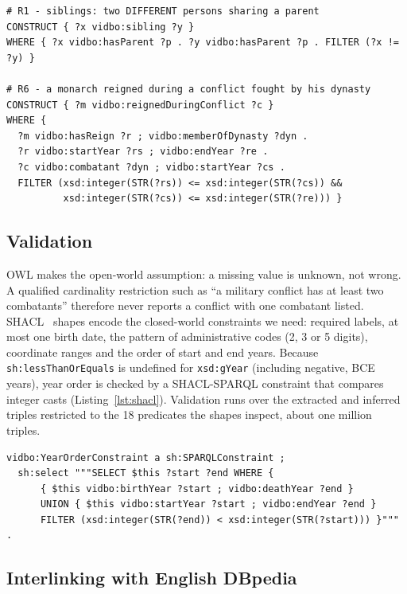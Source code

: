 \documentclass{article}
\begin{document}
\begin{lstlisting}[language=sparql, caption={Two rules of the rule layer: the sibling rule and the temporal rule R6.}, label=lst:rules]
# R1 - siblings: two DIFFERENT persons sharing a parent
CONSTRUCT { ?x vidbo:sibling ?y }
WHERE { ?x vidbo:hasParent ?p . ?y vidbo:hasParent ?p . FILTER (?x != ?y) }

# R6 - a monarch reigned during a conflict fought by his dynasty
CONSTRUCT { ?m vidbo:reignedDuringConflict ?c }
WHERE {
  ?m vidbo:hasReign ?r ; vidbo:memberOfDynasty ?dyn .
  ?r vidbo:startYear ?rs ; vidbo:endYear ?re .
  ?c vidbo:combatant ?dyn ; vidbo:startYear ?cs .
  FILTER (xsd:integer(STR(?rs)) <= xsd:integer(STR(?cs)) &&
          xsd:integer(STR(?cs)) <= xsd:integer(STR(?re))) }
\end{lstlisting}

\subsection{Validation}\label{sec:validate}

OWL makes the open-world assumption: a missing value is unknown, not wrong. A qualified cardinality restriction such
as ``a military conflict has at least two combatants'' therefore never reports a conflict with one combatant listed.
SHACL~\cite{shacl2017} shapes encode the closed-world constraints we need: required labels, at most one birth date,
the pattern of administrative codes (2, 3 or 5 digits), coordinate ranges and the order of start and end years.
Because \texttt{sh:lessThanOrEquals} is undefined for \texttt{xsd:gYear} (including negative, BCE years), year order is
checked by a SHACL-SPARQL constraint that compares integer casts (Listing~\ref{lst:shacl}). Validation runs over the
extracted and inferred triples restricted to the 18 predicates the shapes inspect, about one million triples.

\begin{lstlisting}[language=turtle, caption={SHACL-SPARQL constraint checking that end years do not precede start years.}, label=lst:shacl]
vidbo:YearOrderConstraint a sh:SPARQLConstraint ;
  sh:select """SELECT $this ?start ?end WHERE {
      { $this vidbo:birthYear ?start ; vidbo:deathYear ?end }
      UNION { $this vidbo:startYear ?start ; vidbo:endYear ?end }
      FILTER (xsd:integer(STR(?end)) < xsd:integer(STR(?start))) }""" .
\end{lstlisting}

\subsection{Interlinking with English DBpedia}\label{sec:link}
\end{document}
